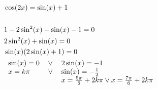 \documentclass[preview,convert={density=300,outext=.png}]{standalone}
\begin{document}
\begin{align*}
    & \cos(2x) = \sin(x) + 1 \\
    & \\
    & 1 - 2\sin^2(x) - \sin(x) - 1 = 0 \\
    & 2\sin^2(x) + \sin(x) = 0 \\
    & \sin(x)(2\sin(x) + 1) = 0 \\
    & \begin{tabular}{ l l l }
        $\sin(x) = 0$ & $\vee$ & $2\sin(x) = -1$ \\
        $x = k\pi$ & $\vee$ & $\sin(x) = -\frac{1}{2}$ \\
        $ $ & $ $ & $x = \frac{5\pi}{6} + 2k\pi \vee x = \frac{7\pi}{6} + 2k\pi$ \\
    \end{tabular}
\end{align*}
\end{document}
